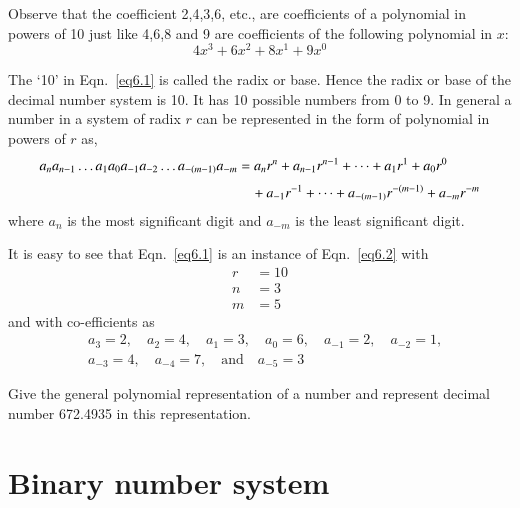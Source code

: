 Observe that the coefficient 2,4,3,6, etc., are coefficients of a polynomial in powers of 10 just like 4,6,8 and 9 are coefficients of the following polynomial in $x$:
$$
4x^{3}+6x^{2}+8x^{1}+9x^{0}
$$

The `10' in Eqn.~\eqref{eq6.1} is called the radix or base. Hence the radix or base of the decimal number system is 10. It has 10 possible numbers from 0 to 9. In general a number in a system of radix $r$ can be represented in the form of polynomial in powers of $r$ as,
\begin{align}
a_{n}a_{n-1}\ldots a_{1}a_{0}a_{-1}a_{-2}\ldots a_{-(m-1)}a_{-m} &= a_{n}r^{n}+a_{n-1}r^{n-1}+\cdots+a_{1}r^{1}+a_{0}r^{0}\notag\\[3pt]
&\quad + a_{-1}r^{-1}+\cdots+a_{-(m-1)}r^{-(m-1)}+a_{-m}r^{-m}\label{eq6.2}
\end{align}
where $a_{n}$ is the most significant digit and $a_{-m}$ is the least significant digit.

It is easy to see that Eqn.~\eqref{eq6.1} is an instance of Eqn.~\eqref{eq6.2} with
\begin{align*}
r &= 10\\[3pt]
n &= 3\\[3pt]
m &= 5
\end{align*}
and with co-efficients as
\begin{align*}
&a_{3}=2,\quad a_{2}=4,\quad a_{1}=3,\quad a_{0}=6,\quad a_{-1}=2,\quad a_{-2}=1,\\[3pt]
& a_{-3}=4,\quad a_{-4}=7,\quad \text{and}\quad a_{-5}=3
\end{align*}

\begin{example}\label{exam6.1}
Give the general polynomial representation of a number and represent decimal number 672.4935 in this representation.
\end{example}


\section{Binary number system}\label{sec6.3}

